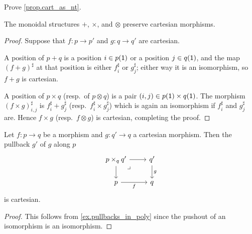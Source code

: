 \documentclass[Book-Poly]{subfiles}
\begin{document}
\begin{exercise}
Prove \cref{prop.cart_as_nt}.
\end{exercise}

\begin{proposition}\label{prop.monoidal_pres_carts}
The monoidal structures $+$, $\times$, and $\otimes$ preserve cartesian morphisms.
\end{proposition}
\begin{proof}
Suppose that  $f\colon p\to p'$ and $g\colon q\to q'$ are cartesian. 

A position of $p+q$ is a position $i\in p(\textsf{1})$ or a position $j\in q(\textsf{1})$, and the map $(f+g)^\sharp$ at that position is either $f^\sharp_i$ or $g^\sharp_j$; either way it is an isomorphism, so $f+g$ is cartesian.

A position of $p\times q$ (resp.\ of $p\otimes q$) is a pair $(i,j)\in p(\textsf{1})\times q(\textsf{1})$. The morphism $(f\times g)^\sharp_{i,j}$ is $f^\sharp_i+g^\sharp_j$ (resp.\ $f^\sharp_i\times g^\sharp_j$) which is again an isomorphism if $f^\sharp_i$ and $g^\sharp_j$ are. Hence $f\times g$ (resp.\ $f\otimes g$) is cartesian, completing the proof.
\end{proof}

\begin{proposition}\label{prop.pullback_cartesian}
Let $f\colon p\to q$ be a morphism and $g\colon q'\to q$ a cartesian morphism. Then the pullback $g'$ of $g$ along $p$
\[
\begin{tikzcd}
	p\times_qq'\ar[r]\ar[d]&
	q'\ar[d, "g"]\\
	p\ar[r, "f"']&
	q\ar[ul, phantom, very near end, "\lrcorner"]
\end{tikzcd}
\]
is cartesian.
\end{proposition}
\begin{proof}
This follows from \cref{ex.pullbacks_in_poly} since the pushout of an isomorphism is an isomorphism.
\end{proof}
\end{document}
